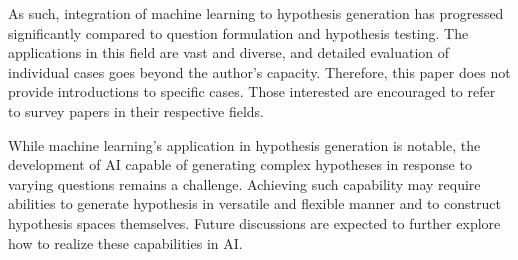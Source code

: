 As such, integration of machine learning to hypothesis generation has progressed significantly compared to question formulation and hypothesis testing. The applications in this field are vast and diverse, and detailed evaluation of individual cases goes beyond the author's capacity. Therefore, this paper does not provide introductions to specific cases. Those interested are encouraged to refer to survey papers in their respective fields.

While machine learning's application in hypothesis generation is notable, the development of AI capable of generating complex hypotheses in response to varying questions remains a challenge. Achieving such capability may require abilities to generate hypothesis in versatile and flexible manner and to construct hypothesis spaces themselves. Future discussions are expected to further explore how to realize these capabilities in AI.




